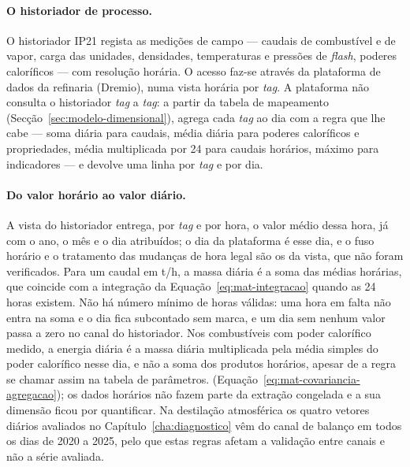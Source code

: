 \paragraph{O historiador de processo.} O historiador IP21 regista as
medições de campo --- caudais de combustível e de vapor, carga das
unidades, densidades, temperaturas e pressões de \emph{flash}, poderes
caloríficos --- com resolução horária.  O
acesso faz-se através da plataforma de dados da refinaria (Dremio), numa
vista horária por \emph{tag}. A plataforma não consulta o historiador
\emph{tag} a \emph{tag}: a partir da tabela de mapeamento
(Secção~\ref{sec:modelo-dimensional}), agrega cada \emph{tag} ao dia com a
regra que lhe cabe --- soma diária para caudais, média diária para poderes
caloríficos e propriedades, média multiplicada por 24 para caudais
horários, máximo para indicadores --- e devolve uma linha por \emph{tag} e
por dia. 

\paragraph{Do valor horário ao valor diário.} A vista do historiador
entrega, por \emph{tag} e por hora, o valor médio dessa hora, já com o ano, o
mês e o dia atribuídos; o dia da plataforma é esse dia, e o fuso horário e
o tratamento das mudanças de hora legal são os da vista, que não foram
verificados. Para um caudal em t/h, a massa diária é a soma das médias
horárias, que coincide com a integração da
Equação~\eqref{eq:mat-integracao} quando as 24 horas existem. Não há número
mínimo de horas válidas: uma hora em falta não entra na soma e o dia fica
subcontado sem marca, e um dia sem nenhum valor passa a zero no canal do historiador. Nos combustíveis com poder calorífico medido, a energia diária
é a massa diária multiplicada pela média simples do poder calorífico nesse
dia, e não a soma dos produtos horários, apesar de a regra se chamar assim
na tabela de parâmetros. 
(Equação~\eqref{eq:mat-covariancia-agregacao}); os dados horários não fazem
parte da extração congelada e a sua dimensão ficou por quantificar. Na
destilação atmosférica os quatro vetores diários avaliados no
Capítulo~\ref{cha:diagnostico} vêm do canal de balanço em todos os dias de
2020 a 2025, pelo que estas regras afetam a validação entre canais e não a
série avaliada.

